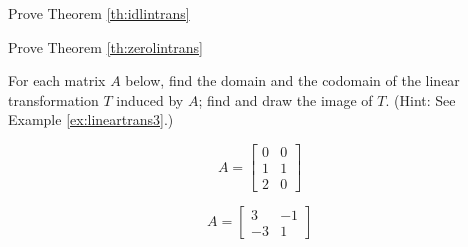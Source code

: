 \documentclass{ximera}
\begin{document}
\begin{problem}\label{prob:idtrans} Prove Theorem \ref{th:idlintrans}\end{problem}

\begin{problem}\label{prob:zerotrans} Prove Theorem \ref{th:zerolintrans}\end{problem}

\begin{problem}\label{prob:domaincodomain}
For each matrix $A$ below, find the domain and the codomain of the linear transformation $T$ induced by $A$; find and draw the image of $T$. (Hint: See Example \ref{ex:lineartrans3}.)
  \begin{problem}\label{prob:domaincodomain1}
  $$A=\begin{bmatrix}0&0\\1&1\\2&0\end{bmatrix}$$
  \end{problem}
  \begin{problem}\label{prob:domaincodomain2}
  $$A=\begin{bmatrix}3&-1\\-3&1\end{bmatrix}$$
   \end{problem}
\end{problem}
\end{document}
